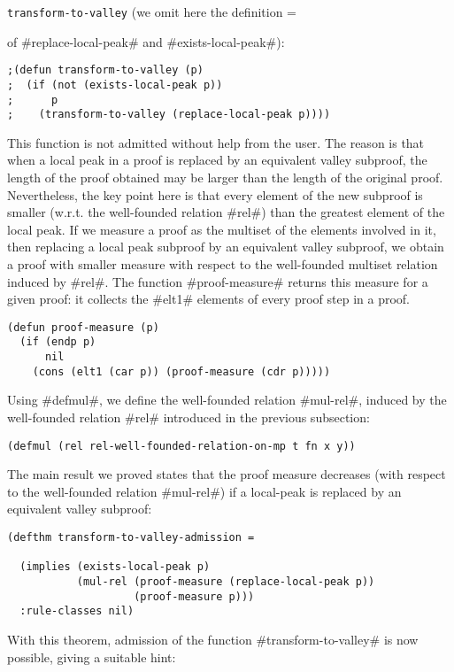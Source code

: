 \documentclass[11pt]{llncs}
\begin{document}
{{\tt trans\-form\--to\--valley} (we omit here the definition =

of #replace-local-peak# and #exists-local-peak#):


\begin{verbatim}
;(defun transform-to-valley (p)
;  (if (not (exists-local-peak p))
;      p
;    (transform-to-valley (replace-local-peak p))))
\end{verbatim}

This function is not admitted without help from the user. The reason is
that when a local peak in a proof is replaced by an equivalent valley
subproof, the length of the proof obtained may be larger than the length
of the original proof. Nevertheless, the key point here is that every
element of the new subproof is smaller (w.r.t. the well-founded relation
#rel#) than the greatest element of the local peak. If we measure a
proof as the multiset of the elements involved in it, then replacing a
local peak subproof by an equivalent valley subproof, we obtain a proof
with smaller measure with respect to the well-founded multiset relation
induced by #rel#.  The function #proof-measure# returns this measure for
a given proof: it collects the #elt1# elements of every proof step in a
proof.

\begin{verbatim}
(defun proof-measure (p)
  (if (endp p)
      nil
    (cons (elt1 (car p)) (proof-measure (cdr p)))))
\end{verbatim}

Using #defmul#, we define the well-founded relation #mul-rel#, induced
by the well-founded relation #rel# introduced in the previous
subsection:

\begin{verbatim}
(defmul (rel rel-well-founded-relation-on-mp t fn x y))
\end{verbatim}

The main result we proved states that the proof measure decreases (with
respect to the well-founded relation #mul-rel#) if a local-peak is
replaced by an equivalent valley subproof:

\begin{verbatim}
(defthm transform-to-valley-admission =

  (implies (exists-local-peak p)
           (mul-rel (proof-measure (replace-local-peak p))
                    (proof-measure p)))
  :rule-classes nil)
\end{verbatim}

With this theorem, admission of the function #transform-to-valley# is
now possible, giving a suitable hint:

}
\end{document}
